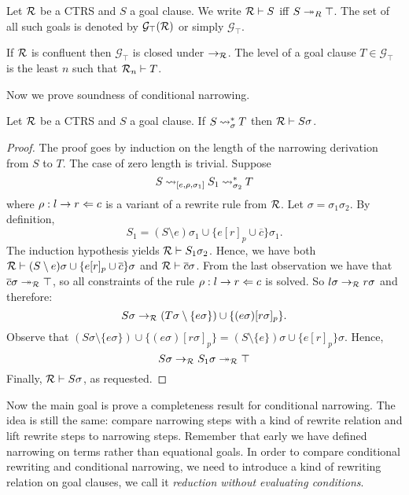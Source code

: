 \begin{definition}
	Let $\mathcal{R}$ be a CTRS and $S$ a goal clause. We write $\mathcal{R} \vdash S$ iff $S \twoheadrightarrow_R \top$. The set of all such goals is denoted by $\mathcal{G}_\top(\mathcal{R})$ or simply $\mathcal{G}_\top$.
\end{definition}

If $\mathcal{R}$ is confluent then $\mathcal{G}_\top$ is closed under $\rightarrow_{\mathcal{R}}$. The level of a goal clause $T \in \mathcal{G}_\top$ is the least $n$ such that $\mathcal{R}_n \vdash T$.

Now we prove soundness of conditional narrowing.

\begin{theorem}
	Let $\mathcal{R}$ be a CTRS and $S$ a goal clause. If $S \mathbin{\rightsquigarrow}_\sigma^* T$ then $\mathcal{R} \vdash S \sigma$.
	\begin{proof}
		The proof goes by induction on the length of the narrowing derivation from $S$ to $T$. The case of zero length is trivial. Suppose
		$$S \mathbin{\rightsquigarrow}_{[e, \rho, \sigma_1]} S_1 \mathbin{\rightsquigarrow}_{\sigma_2}^* T$$
		where $\rho : l \rightarrow r \Leftarrow c$ is a variant of a rewrite rule from $\mathcal{R}$. Let $\sigma = \sigma_1 \sigma_2$. By definition,
		$$S_1 = (S \setminus {e})\sigma_1 \cup \{ e[r]_p \cup \overline{c} \}\sigma_1.$$
		The induction hypothesis yields $\mathcal{R} \vdash S_1 \sigma_2$. Hence, we have both $\mathcal{R} \vdash (S \setminus {e}) \sigma \cup \{e[r]_p \cup \overline{c} \}\sigma$ and $\mathcal{R} \vdash \overline{c} \sigma$. From the last observation we have that $\overline{c}\sigma \twoheadrightarrow_{\mathcal{R}} \top$, so all constraints of the rule $\rho : l \rightarrow r \Leftarrow c$ is solved. So $l\sigma \rightarrow_{\mathcal{R}} r \sigma$ and therefore:
		$$S \sigma \rightarrow_{\mathcal{R}} (T \sigma \setminus \{ e\sigma \}) \cup \{ (e\sigma)[r\sigma]_p \}.$$
		Observe that $(S \sigma \setminus \{ e\sigma \}) \cup \{ (e\sigma)[r\sigma]_p \} = (S \setminus \{e\})\sigma \cup \{ e[r]_p \}\sigma$. Hence,
		$$S \sigma \rightarrow_{\mathcal{R}} S_1\sigma \twoheadrightarrow_{\mathcal{R}} \top$$
		Finally, $\mathcal{R} \vdash S \sigma$, as requested.
	\end{proof}
\end{theorem}

Now the main goal is prove a completeness result for conditional narrowing. The idea is still the same: compare narrowing steps with a kind of rewrite relation and lift rewrite steps to narrowing steps. Remember that early we have defined narrowing on terms rather than equational goals. In order to compare conditional rewriting and conditional narrowing, we need to introduce a kind of rewriting relation on goal clauses, we call it \textit{reduction without evaluating conditions}.

